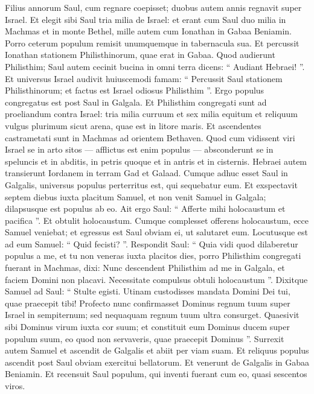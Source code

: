 \begin{biblechapter}
\begin{biblechapter}
\begin{biblechapter}
\begin{biblechapter}
\begin{biblechapter}
\begin{biblechapter}
\begin{biblechapter}
\begin{biblechapter}
\begin{biblechapter}
\begin{biblechapter}
\begin{biblechapter}
\begin{biblechapter}
\begin{biblechapter}
\verse Filius annorum Saul, cum regnare coepisset; duobus autem annis regnavit super Israel.
 \verse Et elegit sibi Saul tria milia de Israel: et erant cum Saul duo milia in Machmas et in monte Bethel, mille autem cum Ionathan in Gabaa Beniamin. Porro ceterum populum remisit unumquemque in tabernacula sua. 
\verse Et percussit Ionathan stationem Philisthinorum, quae erat in Gabaa. Quod audierunt Philisthim; Saul autem cecinit bucina in omni terra dicens: “ Audiant Hebraei! ”. 
\verse Et universus Israel audivit huiuscemodi famam: “ Percussit Saul stationem Philisthinorum; et factus est Israel odiosus Philisthim ”. Ergo populus congregatus est post Saul in Galgala.
 \verse Et Philisthim congregati sunt ad proeliandum contra Israel: tria milia curruum et sex milia equitum et reliquum vulgus plurimum sicut arena, quae est in litore maris. Et ascendentes castrametati sunt in Machmas ad orientem Bethaven. 
\verse Quod cum vidissent viri Israel se in arto sitos — afflictus est enim populus — absconderunt se in speluncis et in abditis, in petris quoque et in antris et in cisternis. 
\verse Hebraei autem transierunt Iordanem in terram Gad et Galaad.
 Cumque adhuc esset Saul in Galgalis, universus populus perterritus est, qui sequebatur eum. 
\verse Et exspectavit septem diebus iuxta placitum Samuel, et non venit Samuel in Galgala; dilapsusque est populus ab eo. 
\verse Ait ergo Saul: “ Afferte mihi holocaustum et pacifica ”. Et obtulit holocaustum.
 \verse Cumque complesset offerens holocaustum, ecce Samuel veniebat; et egressus est Saul obviam ei, ut salutaret eum. 
\verse Locutusque est ad eum Samuel: “ Quid fecisti? ”. Respondit Saul: “ Quia vidi quod dilaberetur populus a me, et tu non veneras iuxta placitos dies, porro Philisthim congregati fuerant in Machmas, 
\verse dixi: Nunc descendent Philisthim ad me in Galgala, et faciem Domini non placavi. Necessitate compulsus obtuli holocaustum ”.
 \verse Dixitque Samuel ad Saul: “ Stulte egisti. Utinam custodisses mandata Domini Dei tui, quae praecepit tibi! Profecto nunc confirmasset Dominus regnum tuum super Israel in sempiternum; 
\verse sed nequaquam regnum tuum ultra consurget. Quaesivit sibi Dominus virum iuxta cor suum; et constituit eum Dominus ducem super populum suum, eo quod non servaveris, quae praecepit Dominus ”.
 \verse Surrexit autem Samuel et ascendit de Galgalis et abiit per viam suam. Et reliquus populus ascendit post Saul obviam exercitui bellatorum. Et venerunt de Galgalis in Gabaa Beniamin. Et recensuit Saul populum, qui inventi fuerant cum eo, quasi sescentos viros.

\end{biblechapter}
\end{biblechapter}
\end{biblechapter}
\end{biblechapter}
\end{biblechapter}
\end{biblechapter}
\end{biblechapter}
\end{biblechapter}
\end{biblechapter}
\end{biblechapter}
\end{biblechapter}
\end{biblechapter}
\end{biblechapter}
